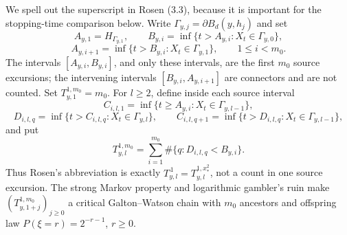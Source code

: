 We spell out the superscript in Rosen (3.3), because it is important for
the stopping-time comparison below.  Write
$\Gamma_{y,j}=\partial B_d(y,h_j)$ and set
\[
A_{y,1}=H_{\Gamma_{y,1}},\qquad
 B_{y,i}=\inf\{t>A_{y,i}:X_t\in\Gamma_{y,0}\},
\]
\begin{equation}
A_{y,i+1}=\inf\{t>B_{y,i}:X_t\in\Gamma_{y,1}\},
                    \qquad 1\le i<m_0.\label{eq:ct-external-32b}
\end{equation}
The intervals $[A_{y,i},B_{y,i}]$, and only these intervals, are the
first $m_0$ source excursions; the intervening intervals
$[B_{y,i},A_{y,i+1}]$ are connectors and are not counted.  Set
$T_{y,1}^{1,m_0}=m_0$.  For $l\ge2$, define inside each source
interval
\[
C_{i,l,1}=\inf\{t\ge A_{y,i}:X_t\in\Gamma_{y,l-1}\},
\]
\[
D_{i,l,q}=\inf\{t>C_{i,l,q}:X_t\in\Gamma_{y,l}\},\qquad
 C_{i,l,q+1}=\inf\{t>D_{i,l,q}:X_t\in\Gamma_{y,l-1}\},
\]
and put
\begin{equation}
T_{y,l}^{1,m_0}=\sum_{i=1}^{m_0}
             \#\{q:D_{i,l,q}<B_{y,i}\}.\label{eq:ct-external-32c}
\end{equation}
Thus Rosen's abbreviation is exactly
$T_{y,l}^{\,1}=T_{y,l}^{1,x_*^2}$, not a count in one source
excursion.  The strong Markov property and logarithmic gambler's ruin
make $(T_{y,1+j}^{1,m_0})_{j\ge0}$ a critical Galton--Watson chain
with $m_0$ ancestors and offspring law
$P(\xi=r)=2^{-r-1}$, $r\ge0$.

